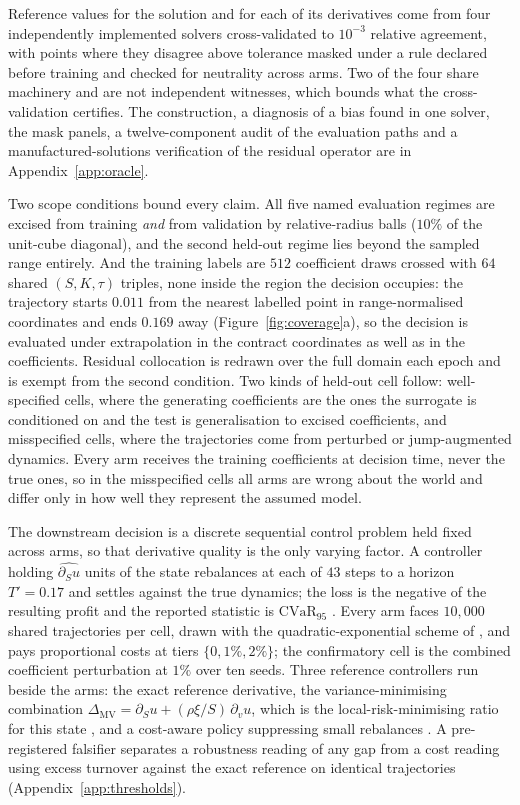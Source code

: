 \documentclass{article}
\begin{document}
Reference values for the solution and for each of its derivatives come from four
independently implemented solvers cross-validated to $10^{-3}$ relative agreement,
with points where they disagree above tolerance masked under a rule declared before
training and checked for neutrality across arms. Two of the four share machinery and
are not independent witnesses, which bounds what the cross-validation certifies. The construction, a diagnosis of a bias found in one solver, the mask panels, a
twelve-component audit of the evaluation paths and a manufactured-solutions
verification of the residual operator are in Appendix~\ref{app:oracle}.

Two scope conditions bound every claim. All five named evaluation regimes are
excised from training \emph{and} from validation by relative-radius balls ($10\%$ of
the unit-cube diagonal), and the second held-out regime lies beyond the sampled
range entirely. And the training labels are $512$ coefficient draws crossed with
$64$ shared $(S,K,\tau)$ triples, none inside the region the decision occupies: the
trajectory starts $0.011$ from the nearest labelled point in range-normalised
coordinates and ends $0.169$ away (Figure~\ref{fig:coverage}a), so the decision is
evaluated under extrapolation in the contract coordinates as well as in the
coefficients. Residual collocation is redrawn over the full domain each epoch and is
exempt from the second condition. Two kinds of held-out cell follow: well-specified cells, where the generating
coefficients are the ones the surrogate is conditioned on and the test is
generalisation to excised coefficients, and misspecified cells, where the
trajectories come from perturbed or jump-augmented dynamics. Every arm receives the
training coefficients at decision time, never the true ones, so in the misspecified
cells all arms are wrong about the world and differ only in how well they represent
the assumed model.

The downstream decision is a discrete sequential control problem held fixed across
arms, so that derivative quality is the only varying factor. A controller holding
$\widehat{\partial_S u}$ units of the state rebalances at each of $43$ steps to a
horizon $T' = 0.17$ and settles against the true dynamics; the loss is the negative
of the resulting profit and the reported statistic is $\mathrm{CVaR}_{95}$
\citep{rockafellar2000optimization}. Every arm faces $10{,}000$ shared trajectories
per cell, drawn with the quadratic-exponential scheme of
\citet{andersen2008simple}, and pays proportional costs at tiers
$\{0, 1\%, 2\%\}$; the confirmatory cell is the combined coefficient perturbation at
$1\%$ over ten seeds. Three reference controllers run beside the arms: the exact
reference derivative, the variance-minimising combination
$\Delta_{\mathrm{MV}} = \partial_S u + (\rho\xi/S)\,\partial_v u$, which is the
local-risk-minimising ratio for this state \citep{follmer1991hedging}, and a
cost-aware policy suppressing small rebalances \citep{whalley1997asymptotic}. A
pre-registered falsifier separates a robustness reading of any gap from a cost
reading using excess turnover against the exact reference on identical trajectories
(Appendix~\ref{app:thresholds}).
\end{document}
